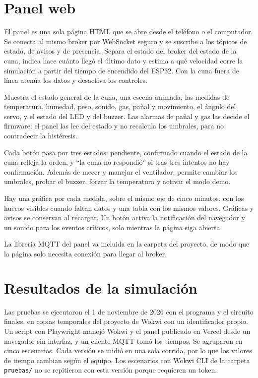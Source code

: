 \section{Panel web}

El panel es una sola página HTML que se abre desde el teléfono o el computador. Se
conecta al mismo broker por WebSocket seguro y se suscribe a los tópicos de estado, de
avisos y de presencia. Separa el estado del broker del estado de la cuna, indica hace
cuánto llegó el último dato y estima a qué velocidad corre la simulación a partir del
tiempo de encendido del ESP32. Con la cuna fuera de línea atenúa los datos y desactiva
los controles.

Muestra el estado general de la cuna, una escena animada, las medidas de temperatura,
humedad, peso, sonido, gas, pañal y movimiento, el ángulo del servo, y el estado del LED
y del buzzer. Las alarmas de pañal y gas las decide el firmware: el panel las lee del
estado y no recalcula los umbrales, para no contradecir la histéresis.

Cada botón pasa por tres estados: pendiente, confirmado cuando el estado de la cuna
refleja la orden, y ``la cuna no respondió'' si tras tres intentos no hay confirmación.
Además de mecer y manejar el ventilador, permite cambiar los umbrales, probar el buzzer,
forzar la temperatura y activar el modo demo.

Hay una gráfica por cada medida, sobre el mismo eje de cinco minutos, con los huecos
visibles cuando faltan datos y una tabla con los mismos valores. Gráficas y avisos se
conservan al recargar. Un botón activa la notificación del navegador y un sonido para los
eventos críticos, solo mientras la página siga abierta.

La librería MQTT del panel va incluida en la carpeta del proyecto, de modo que la
página solo necesita conexión para llegar al broker.

\section{Resultados de la simulación}

Las pruebas se ejecutaron el 1 de noviembre de 2026 con el programa y el circuito
finales, en copias temporales del proyecto de Wokwi con un identificador propio. Un
script con Playwright manejó Wokwi y el panel publicado en Vercel desde un navegador sin
interfaz, y un cliente MQTT tomó los tiempos. Se agruparon en cinco escenarios. Cada
versión se midió en una sola corrida, por lo que los valores de tiempo cambian según el
equipo. Los escenarios con Wokwi CLI de la carpeta \texttt{pruebas/} no se repitieron con
esta versión porque requieren un token.

